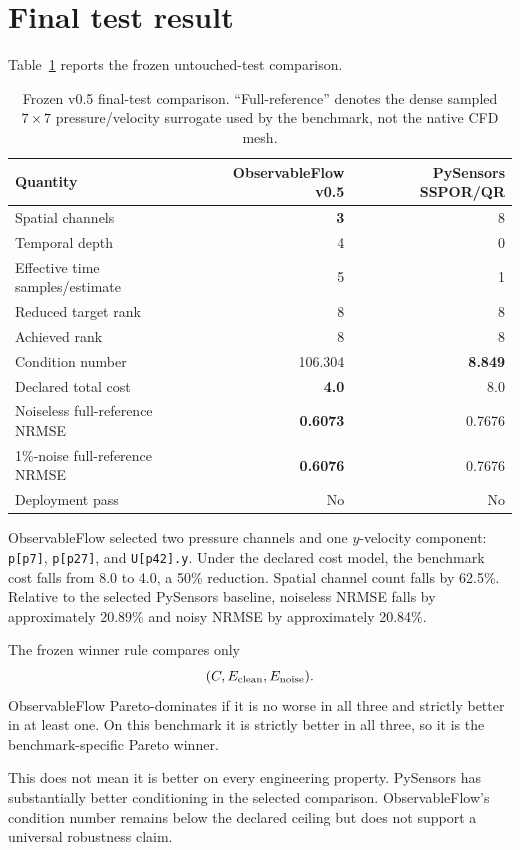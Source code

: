 \documentclass[11pt]{article}
\begin{document}
\section{Final test result}
Table~\ref{tab:result} reports the frozen untouched-test comparison.
\begin{table}[h]
\centering
\small
\begin{tabular}{lrr}
\toprule
Quantity & ObservableFlow v0.5 & PySensors SSPOR/QR \\
\midrule
Spatial channels & \textbf{3} & 8 \\
Temporal depth & 4 & 0 \\
Effective time samples/estimate & 5 & 1 \\
Reduced target rank & 8 & 8 \\
Achieved rank & 8 & 8 \\
Condition number & 106.304 & \textbf{8.849} \\
Declared total cost & \textbf{4.0} & 8.0 \\
Noiseless full-reference NRMSE & \textbf{0.6073} & 0.7676 \\
1\%-noise full-reference NRMSE & \textbf{0.6076} & 0.7676 \\
Deployment pass & No & No \\
\bottomrule
\end{tabular}
\caption{Frozen v0.5 final-test comparison. ``Full-reference'' denotes the dense sampled $7\times7$ pressure/velocity surrogate used by the benchmark, not the native CFD mesh.}
\label{tab:result}
\end{table}

ObservableFlow selected two pressure channels and one $y$-velocity component: \texttt{p[p7]}, \texttt{p[p27]}, and \texttt{U[p42].y}. Under the declared cost model, the benchmark cost falls from 8.0 to 4.0, a 50\% reduction. Spatial channel count falls by 62.5\%. Relative to the selected PySensors baseline, noiseless NRMSE falls by approximately 20.89\% and noisy NRMSE by approximately 20.84\%.

The frozen winner rule compares only
\begin{equation}
(C,E_{\rm clean},E_{\rm noise}).
\end{equation}
ObservableFlow Pareto-dominates if it is no worse in all three and strictly better in at least one. On this benchmark it is strictly better in all three, so it is the benchmark-specific Pareto winner.

This does not mean it is better on every engineering property. PySensors has substantially better conditioning in the selected comparison. ObservableFlow's condition number remains below the declared ceiling but does not support a universal robustness claim.
\end{document}
